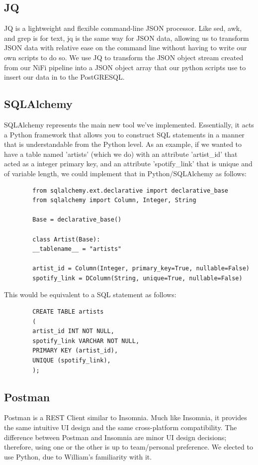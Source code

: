 \documentclass{scrartcl}
\begin{document}
    \subsection{JQ}\label{subsec:jq}
    JQ is a lightweight and flexible command-line JSON processor.
    Like sed, awk, and grep is for text, jq is the same way for JSON data, allowing us to transform JSON data with relative ease on the command line without having to write our own scripts to do so.
    We use JQ to transform the JSON object stream created from our NiFi pipeline into a JSON object array that our python scripts use to insert our data in to the PostGRESQL.

    \subsection{SQLAlchemy}\label{subsec:sqlalchemy}
    SQLAlchemy represents the main new tool we've implemented.
    Essentially, it acts a Python framework that allows you to construct SQL statements in a manner that is understandable from the Python level.
    As an example, if we wanted to have a table named 'artists' (which we do) with an attribute 'artist\_id' that acted as a integer primary key, and an attribute 'spotify\_link' that is unique and of variable length, we could implement that in Python/SQLAlchemy as follows:

    \newpage
    \begin{verbatim}
        from sqlalchemy.ext.declarative import declarative_base
        from sqlalchemy import Column, Integer, String

        Base = declarative_base()

        class Artist(Base):
        __tablename__ = "artists"

        artist_id = Column(Integer, primary_key=True, nullable=False)
        spotify_link = DColumn(String, unique=True, nullable=False)
    \end{verbatim}

    This would be equivalent to a SQL statement as follows:

    \begin{verbatim}
        CREATE TABLE artists
        (
        artist_id INT NOT NULL,
        spotify_link VARCHAR NOT NULL,
        PRIMARY KEY (artist_id),
        UNIQUE (spotify_link),
        );
    \end{verbatim}

    \subsection{Postman}\label{subsec:postman}
    Postman is a REST Client similar to Insomnia.
    Much like Insomnia, it provides the same intuitive UI design and the same cross-platform compatibility.
    The difference between Postman and Insomnia are minor UI design decisions;
    therefore, using one or the other is up to team/personal preference.
    We elected to use Python, due to William's familiarity with it.
\end{document}
